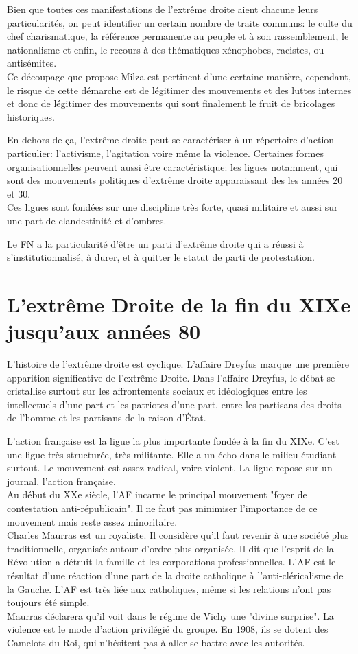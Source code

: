 \documentclass[10pt, a4paper, openany]{book}
\begin{document}
Bien que toutes ces manifestations de l'extrême droite aient chacune leurs particularités, on peut identifier un certain nombre de traits communs: le culte du chef charismatique, la référence permanente au peuple et à son rassemblement, le nationalisme et enfin, le recours à des thématiques xénophobes, racistes, ou antisémites. \\
Ce découpage que propose Milza est pertinent d'une certaine manière, cependant, le risque de cette démarche est de légitimer des mouvements et des luttes internes et donc de légitimer des mouvements qui sont finalement le fruit de bricolages historiques. 


En dehors de ça, l'extrême droite peut se caractériser à un répertoire d'action particulier: l'activisme, l'agitation voire même la violence. Certaines formes organisationnelles peuvent aussi être caractéristique: les ligues notamment, qui sont des mouvements politiques d'extrême droite apparaissant des les années 20 et 30. \\
Ces ligues sont fondées sur une discipline très forte, quasi militaire et aussi sur une part de clandestinité et d'ombres. 


Le FN a la particularité d'être un parti d'extrême droite qui a réussi à s'institutionnalisé, à durer, et à quitter le statut de parti de protestation.

\section{L'extrême Droite de la fin du XIXe jusqu'aux années 80}

L'histoire de l'extrême droite est cyclique. L'affaire Dreyfus marque une première apparition significative de l'extrême Droite. Dans l'affaire Dreyfus, le débat se cristallise surtout sur les affrontements sociaux et idéologiques entre les intellectuels d'une part et les patriotes d'une part, entre les partisans des droits de l'homme et les partisans de la raison d'État.


L'action française est la ligue la plus importante fondée à la fin du XIXe. C'est une ligue très structurée, très militante. Elle a un écho dans le milieu étudiant surtout. Le mouvement est assez radical, voire violent. La ligue repose sur un journal, l'action française. \\
Au début du XXe siècle, l'AF incarne le principal mouvement "foyer de contestation anti-républicain". Il ne faut pas minimiser l'importance de ce mouvement mais reste assez minoritaire. \\
Charles Maurras est un royaliste. Il considère qu'il faut revenir à une société plus traditionnelle, organisée autour d'ordre plus organisée. Il dit que l'esprit de la Révolution a détruit la famille et les corporations professionnelles. L'AF est le résultat d'une réaction d'une part de la droite catholique à l'anti-cléricalisme de la Gauche. L'AF est très liée aux catholiques, même si les relations n'ont pas toujours été simple. \\ 
Maurras déclarera qu'il voit dans le régime de Vichy une "divine surprise". La violence est le mode d'action privilégié du groupe. En 1908, ils se dotent des Camelots du Roi, qui n'hésitent pas à aller se battre avec les autorités. 
\end{document}
